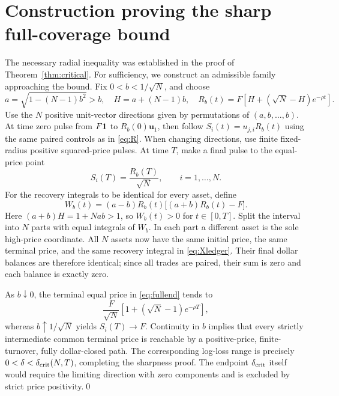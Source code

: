 \documentclass[review,hidelinks,onefignum,onetabnum]{siamonline250211}
\begin{document}
\section{Construction proving the sharp full-coverage bound}\label{app:sharp}
The necessary radial inequality was established in the proof of Theorem~\ref{thm:critical}. For sufficiency, we construct an admissible family approaching the bound. Fix $0<b<1/\sqrt N$, and choose
\begin{equation}\label{eq:fullab}
a=\sqrt{1-(N-1)b^2}>b,
\quad H=a+(N-1)b,
\quad R_b(t)=F\left[H+(\sqrt N-H)e^{-\rho t}\right].
\end{equation}
Use the $N$ positive unit-vector directions given by permutations of $(a,b,\ldots,b)$. At time zero pulse from $F\mathbf{1}$ to $R_b(0)\bm u_1$, then follow $S_i(t)=u_{j,i}R_b(t)$ using the same paired controls as in \eqref{eq:R}. When changing directions, use finite fixed-radius positive squared-price pulses. At time $T$, make a final pulse to the equal-price point
\begin{equation}\label{eq:fullend}
S_i(T)=\frac{R_b(T)}{\sqrt N},\qquad i=1,\ldots,N.
\end{equation}
For the recovery integrals to be identical for every asset, define
\begin{equation}\label{eq:fullW}
W_b(t)=(a-b)R_b(t)\big[(a+b)R_b(t)-F\big].
\end{equation}
Here $(a+b)H=1+Nab>1$, so $W_b(t)>0$ for $t\in[0,T]$. Split the interval into $N$ parts with equal integrals of $W_b$. In each part a different asset is the sole high-price coordinate. All $N$ assets now have the same initial price, the same terminal price, and the same recovery integral in \eqref{eq:Xledger}. Their final dollar balances are therefore identical; since all trades are paired, their sum is zero and each balance is exactly zero.

As $b\downarrow0$, the terminal equal price in \eqref{eq:fullend} tends to
\[
\frac{F}{\sqrt N}\left[1+(\sqrt N-1)e^{-\rho T}\right],
\]
whereas $b\uparrow1/\sqrt N$ yields $S_i(T)\to F$. Continuity in $b$ implies that every strictly intermediate common terminal price is reachable by a positive-price, finite-turnover, fully dollar-closed path. The corresponding log-loss range is precisely $0<\delta<\delta_{\rm crit}(N,T)$, completing the sharpness proof. The endpoint $\delta_{\rm crit}$ itself would require the limiting direction with zero components and is excluded by strict price positivity.\qed
\end{document}
